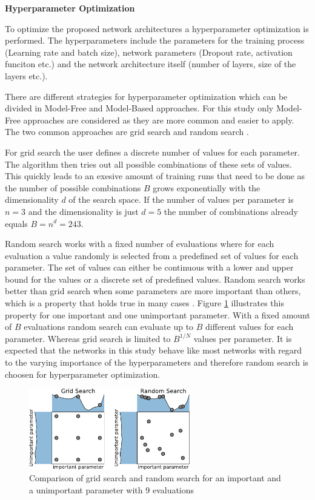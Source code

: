 \documentclass[conference]{IEEEtran}
\begin{document}

\noindent
\textbf{Hyperparameter Optimization}

To optimize the proposed network architectures a hyperparameter optimization is performed. The hyperparameters include the parameters for the training process (Learning rate and batch size), network parameters (Dropout rate, activation funciton etc.) and the network architecture itself (number of layers, size of the layers etc.).

There are different strategies for hyperparameter optimization which can be divided in Model-Free and Model-Based approaches. For this study only Model-Free approaches are considered as they are more common and easier to apply. The two common approaches are grid search and random search \cite{Feurer2019}. 

For grid search the user defines a discrete number of values for each parameter. The algorithm then tries out all possible combinations of these sets of values. This quickly leads to an exesive amount of training runs that need to be done as the number of possible combinations $ B $ grows exponentially with the dimensionality $ d $ of the search space. If the number of values per parameter is $ n = 3 $ and the dimensionality is just $ d = 5 $ the number of combinations already equals $ B = n^d = 243 $.

Random search works with a fixed number of evaluations where for each evaluation a value randomly is selected from a predefined set of values for each parameter. The set of values can either be continuous with a lower and upper bound for the values or a discrete set of predefined values. Random search works better than grid search when some parameters are more important than others, which is a property that holds true in many cases \cite{Feurer2019}. Figure \ref{fig:grid_search_random_search} illustrates this property for one important and one unimportant parameter. With a fixed amount of $ B $ evaluations random search can evaluate up to $ B $ different values for each parameter. Whereas grid search is limited to $ B^{1/N} $ values per parameter. It is expected that the networks in this study behave like most networks with regard to the varying importance of the hyperparameters and therefore random search is choosen for hyperparameter optimization.

\begin{figure}[htp]
	\centering
	\includegraphics[width=7cm]{grid_search_random_search.pdf}
	\caption{Comparison of grid search and random search for an important and a unimportant parameter with 9 evaluations \cite{Feurer2019}}
	\label{fig:grid_search_random_search}
\end{figure}
\end{document}
